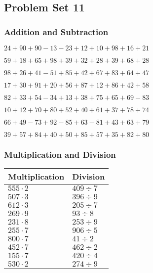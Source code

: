 \hypertarget{problem-set-11}{%
\subsection{Problem Set 11}\label{problem-set-11}}

\hypertarget{addition-and-subtraction}{%
\subsubsection{Addition and
Subtraction}\label{addition-and-subtraction}}

\(24+90+90-13-23+12+10+98+16+21\)

\(59+18+65+98+39+32+28+39+68+28\)

\(98+26+41-51+85+42+67+83+64+47\)

\(17+30+91+20+56+87+12+86+42+58\)

\(82+33+54-34+13+38+75+65+69-83\)

\(10+12+70+80+52+40+61+37+78+74\)

\(66+49-73+92-85+63-81+43+63+79\)

\(39+57+84+40+50+85+57+35+82+80\)

\hypertarget{multiplication-and-division}{%
\subsubsection{Multiplication and
Division}\label{multiplication-and-division}}

\begin{longtable}[]{@{}ll@{}}
\toprule
Multiplication & Division\tabularnewline
\midrule
\endhead
\(555\cdot2\) & \(409÷7\)\tabularnewline
\(507\cdot3\) & \(396÷9\)\tabularnewline
\(612\cdot3\) & \(205÷7\)\tabularnewline
\(269\cdot9\) & \(93÷8\)\tabularnewline
\(231\cdot8\) & \(253÷9\)\tabularnewline
\(255\cdot7\) & \(906÷5\)\tabularnewline
\(800\cdot7\) & \(41÷2\)\tabularnewline
\(452\cdot7\) & \(462÷2\)\tabularnewline
\(155\cdot7\) & \(420÷4\)\tabularnewline
\(530\cdot2\) & \(274÷9\)\tabularnewline
\bottomrule
\end{longtable}

